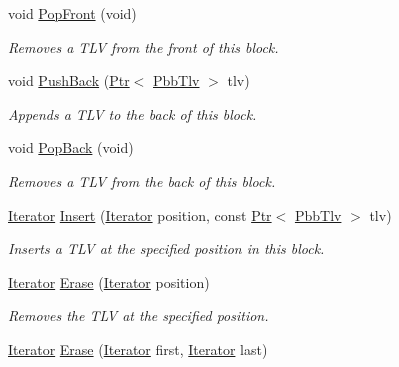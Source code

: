 \begin{DoxyCompactItemize}
void \hyperlink{classns3_1_1PbbTlvBlock_a413dfd32294a503407a474daf0881c75}{Pop\+Front} (void)
\begin{DoxyCompactList}\small\item\em Removes a T\+LV from the front of this block. \end{DoxyCompactList}\item 
void \hyperlink{classns3_1_1PbbTlvBlock_a12a1fe93a89afc8cf573e4beb17382f1}{Push\+Back} (\hyperlink{classns3_1_1Ptr}{Ptr}$<$ \hyperlink{classns3_1_1PbbTlv}{Pbb\+Tlv} $>$ tlv)
\begin{DoxyCompactList}\small\item\em Appends a T\+LV to the back of this block. \end{DoxyCompactList}\item 
void \hyperlink{classns3_1_1PbbTlvBlock_a135bc8625008ad1e1ccd8c57e9a45e71}{Pop\+Back} (void)
\begin{DoxyCompactList}\small\item\em Removes a T\+LV from the back of this block. \end{DoxyCompactList}\item 
\hyperlink{classns3_1_1PbbTlvBlock_a50ca1859c6f7425f0c9e2fcb11ded31d}{Iterator} \hyperlink{classns3_1_1PbbTlvBlock_a97932c10550c7190bbb0647a9a4343ce}{Insert} (\hyperlink{classns3_1_1PbbTlvBlock_a50ca1859c6f7425f0c9e2fcb11ded31d}{Iterator} position, const \hyperlink{classns3_1_1Ptr}{Ptr}$<$ \hyperlink{classns3_1_1PbbTlv}{Pbb\+Tlv} $>$ tlv)
\begin{DoxyCompactList}\small\item\em Inserts a T\+LV at the specified position in this block. \end{DoxyCompactList}\item 
\hyperlink{classns3_1_1PbbTlvBlock_a50ca1859c6f7425f0c9e2fcb11ded31d}{Iterator} \hyperlink{classns3_1_1PbbTlvBlock_a025649e71e22709040684d6521a0306e}{Erase} (\hyperlink{classns3_1_1PbbTlvBlock_a50ca1859c6f7425f0c9e2fcb11ded31d}{Iterator} position)
\begin{DoxyCompactList}\small\item\em Removes the T\+LV at the specified position. \end{DoxyCompactList}\item 
\hyperlink{classns3_1_1PbbTlvBlock_a50ca1859c6f7425f0c9e2fcb11ded31d}{Iterator} \hyperlink{classns3_1_1PbbTlvBlock_a06ae333ab654e446be3d9f1f1d1c2670}{Erase} (\hyperlink{classns3_1_1PbbTlvBlock_a50ca1859c6f7425f0c9e2fcb11ded31d}{Iterator} first, \hyperlink{classns3_1_1PbbTlvBlock_a50ca1859c6f7425f0c9e2fcb11ded31d}{Iterator} last)

\end{DoxyCompactItemize}
